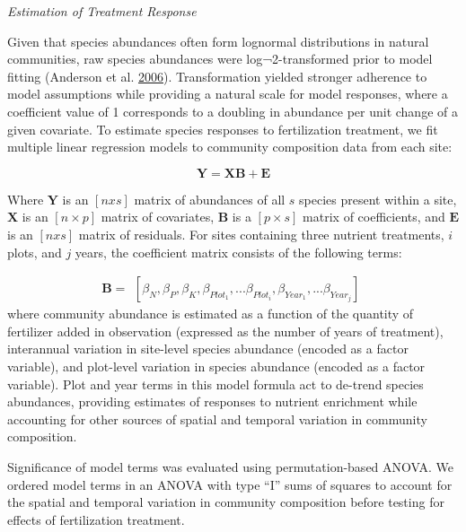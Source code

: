 \documentclass[twoside,12pt,final]{ucthesis-CA2012}
\begin{document}
\begin{ucmainmatter}
\emph{Estimation of Treatment Response}

Given that species abundances often form lognormal distributions in natural communities, raw species abundances were log¬2-transformed prior to model fitting (Anderson et al. \protect\hyperlink{ref-Anderson2006}{2006}). Transformation yielded stronger adherence to model assumptions while providing a natural scale for model responses, where a coefficient value of 1 corresponds to a doubling in abundance per unit change of a given covariate.
To estimate species responses to fertilization treatment, we fit multiple linear regression models to community composition data from each site:

\[\mathbf{Y} = \mathbf{XB} + \mathbf{E}\]

Where \(\mathbf{Y}\) is an \([n x s]\) matrix of abundances of all \(s\) species present within a site, \(\mathbf{X}\) is an \([n \times p]\) matrix of covariates, \(\mathbf{B}\) is a \([p \times s]\) matrix of coefficients, and \(\mathbf{E}\) is an \([n x s]\) matrix of residuals. For sites containing three nutrient treatments, \(i\) plots, and \(j\) years, the coefficient matrix consists of the following terms:

\[\mathbf{B} = \begin{matrix}
    [{\beta}_N, {\beta}_P , {\beta}_K, {\beta}_{Plot_1}, ... {\beta}_{Plot_i},
    {\beta}_{Year_1}, ... {\beta}_{Year_j}]
\end{matrix} \]
where community abundance is estimated as a function of the quantity of fertilizer added in observation (expressed as the number of years of treatment), interannual variation in site-level species abundance (encoded as a factor variable), and plot-level variation in species abundance (encoded as a factor variable). Plot and year terms in this model formula act to de-trend species abundances, providing estimates of responses to nutrient enrichment while accounting for other sources of spatial and temporal variation in community composition.

Significance of model terms was evaluated using permutation-based ANOVA. We ordered model terms in an ANOVA with type ``I'' sums of squares to account for the spatial and temporal variation in community composition before testing for effects of fertilization treatment.


\end{ucmainmatter}
\end{document}
